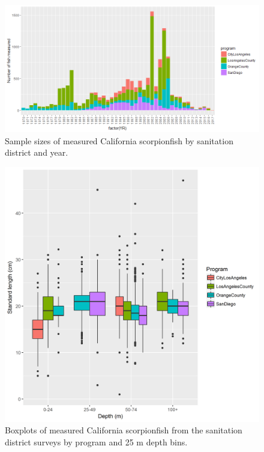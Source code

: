 \documentclass[12pt,]{article}
\begin{document}
\begin{figure}[htbp]
\centering
\includegraphics{Figures/Fleet7_Sanitation_length_source.png}
\caption{Sample sizes of measured California scorpionfish by sanitation
district and year. \label{fig:Fleet7_Sanitation_lengthbydistrict}}
\end{figure}

\begin{figure}[htbp]
\centering
\includegraphics{Figures/Fleet7_Sanitation_lengthboxplots.png}
\caption{Boxplots of measured California scorpionfish from the
sanitation district surveys by program and 25 m depth bins.
\label{fig:Fleet7_Sanitation_lengthboxplots}}
\end{figure}
\end{document}
